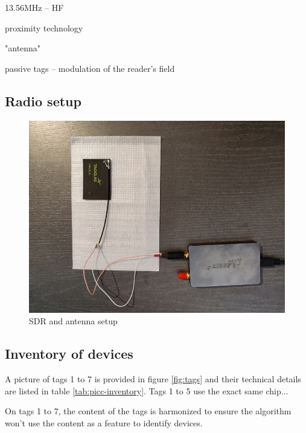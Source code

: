 13.56MHz -- HF

proximity technology

"antenna"

passive tags -- modulation of the reader's field

\subsection{Radio setup}

\begin{figure}[htp!]
  \centering
  \includegraphics[scale=0.25]{figures/data_sdr-setup2.jpg}
  \caption{SDR and antenna setup}
  \label{fig:radio-setup}
\end{figure}

\subsection{Inventory of devices}

A picture of tags 1 to 7 is provided in figure \ref{fig:tags} and their technical details are listed in table \ref{tab:picc-inventory}. Tags 1 to 5 use the exact same chip...

On tags 1 to 7, the content of the tags is harmonized to ensure the algorithm won't use the content as a feature to identify devices.

